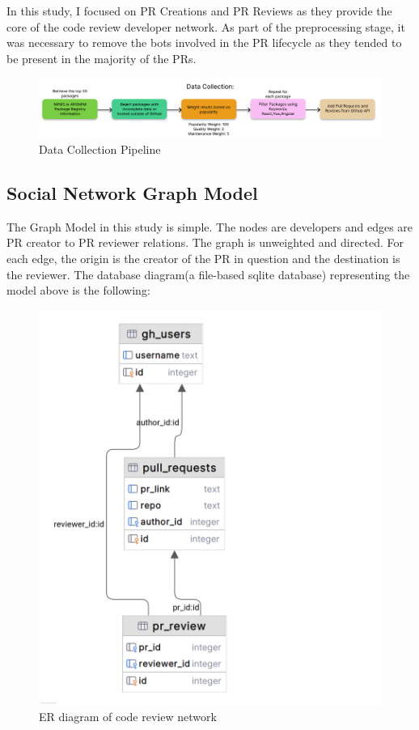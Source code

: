 \documentclass{article}
\begin{document}
In this study, I focused on PR Creations and PR Reviews as they provide the core of the code review developer network. As part of the preprocessing stage, it was necessary to remove the bots involved in the PR lifecycle as they tended to be present in the majority of the PRs.
\begin{figure}[h]
		
\includegraphics[inner,scale=0.35]{data-collection-flow.pdf}
\caption{Data Collection Pipeline}
\end{figure}



\subsection{Social Network Graph Model}
The Graph Model in this study is simple. The nodes are developers and edges are PR creator to PR reviewer relations.
The graph is unweighted and directed. For each edge, the origin is the creator of the PR in question and the destination is the reviewer. The database diagram(a file-based sqlite database) representing the model above is the following:
\begin{figure}[h]
	\begin{center}
\includegraphics[width=\textwidth,inner,scale=0.5]{code-review-network-db-diagram.png}	
\caption{ER diagram of code review network}
	\end{center}
\end{figure}
\end{document}
